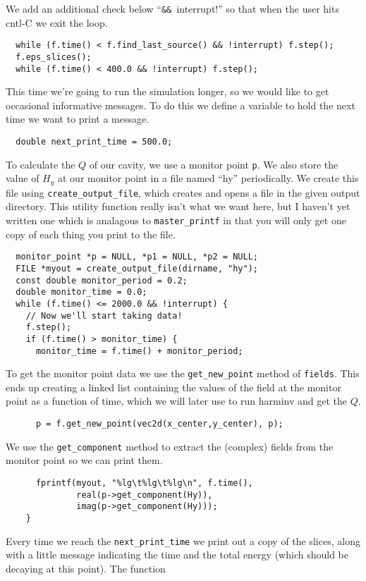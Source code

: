 We add an additional check below ``\verb!&& !interrupt!'' so that when the
user hits cntl-C we exit the loop.
\begin{verbatim}
  while (f.time() < f.find_last_source() && !interrupt) f.step();
  f.eps_slices();
  while (f.time() < 400.0 && !interrupt) f.step();
\end{verbatim}
This time we're going to run the simulation longer, so we would like to get
occasional informative messages.  To do this we define a variable to hold
the next time we want to print a message.
\begin{verbatim}
  double next_print_time = 500.0;
\end{verbatim}
To calculate the $Q$ of our cavity, we use a monitor point \verb!p!.  We
also store the value of $H_y$ at our monitor point in a file named ``hy''
periodically.  We create this file using \verb!create_output_file!, which
creates and opens a file in the given output directory.  This utility
function really isn't what we want here, but I haven't yet written one
which is analagous to \verb!master_printf! in that you will only get one
copy of each thing you print to the file.
\begin{verbatim}
  monitor_point *p = NULL, *p1 = NULL, *p2 = NULL;
  FILE *myout = create_output_file(dirname, "hy");
  const double monitor_period = 0.2;
  double monitor_time = 0.0;
  while (f.time() <= 2000.0 && !interrupt) {
    // Now we'll start taking data!
    f.step();
    if (f.time() > monitor_time) {
      monitor_time = f.time() + monitor_period;
\end{verbatim}
To get the monitor point data we use the \verb!get_new_point! method of
\verb!fields!.  This ends up creating a linked list containing the values
of the field at the monitor point as a function of time, which we will
later use to run harminv and get the $Q$.
\begin{verbatim}
      p = f.get_new_point(vec2d(x_center,y_center), p);
\end{verbatim}
We use the \verb!get_component! method to extract the (complex) fields from
the monitor point so we can print them.
\begin{verbatim}
      fprintf(myout, "%lg\t%lg\t%lg\n", f.time(),
              real(p->get_component(Hy)),
              imag(p->get_component(Hy)));
    }
\end{verbatim}
Every time we reach the \verb!next_print_time! we print out a copy of the
slices, along with a little message indicating the time and the total
energy (which should be decaying at this point).  The function
